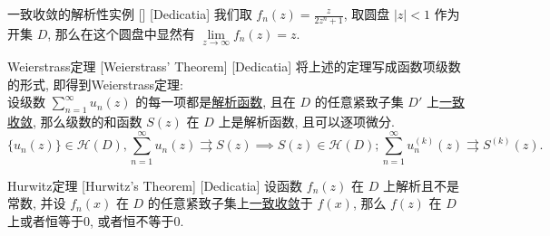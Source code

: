 \documentclass[UTF8]{ctexart}
\newcommand{\AnalyticalFunction}{\hyperref[dfn:AnalyticalFunction]{解析函数}}
\newcommand{\UniformConvergence}{\hyperref[dfn:UniformConvergence]{一致收敛}}
\begin{document}
\begin{xmp}
    [UUID]
    {一致收敛的解析性实例}
    []
    [Dedicatia]
    我们取 \( f_n(z)=\frac{z}{2z^n+1} \), 取圆盘 \( |z|<1 \) 作为开集 \( D \), 那么在这个圆盘中显然有 \( \lim\limits_{z\to\infty}f_n(z)=z \).
\end{xmp}
\begin{thm}
    [UUID]
    {Weierstrass定理}
    [Weierstrass' Theorem]
    [Dedicatia]
    将上述的定理写成函数项级数的形式, 即得到Weierstrass定理: \\
    设级数 \( \sum_{n = 1}^{\infty} u_n(z) \) 的每一项都是\AnalyticalFunction, 且在 \( D \) 的任意紧致子集 \( D' \) 上\UniformConvergence, 那么级数的和函数 \( S(z) \) 在 \( D \) 上是解析函数, 且可以逐项微分. 
    \[\{u_n(z)\}\in\mathcal{H}(D),\sum_{n = 1}^{\infty} u_n(z)\rightrightarrows S(z)\implies S(z)\in\mathcal{H}(D); \sum_{n = 1}^{\infty} u_n^{(k)}(z)\rightrightarrows S^{(k)}(z).\]
\end{thm}
\begin{thm}
    [UUID]
    {Hurwitz定理}
    [Hurwitz's Theorem]
    [Dedicatia]
    设函数 \( f_n(z) \) 在 \( D \) 上解析且不是常数, 并设 \( f_n(x) \) 在 \( D \) 的任意紧致子集上\UniformConvergence 于 \( f(x) \), 那么 \( f(z) \) 在 \( D \) 上或者恒等于0, 或者恒不等于0.
\end{thm}
\end{document}
